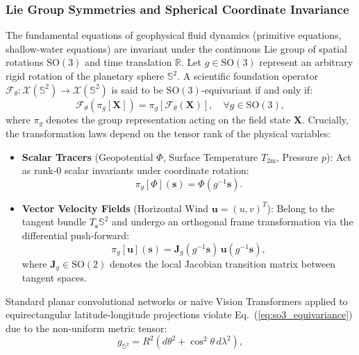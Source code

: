 \subsubsection{Lie Group Symmetries and Spherical Coordinate Invariance}
The fundamental equations of geophysical fluid dynamics (primitive equations, shallow-water equations) are invariant under the continuous Lie group of spatial rotations $\mathrm{SO}(3)$ and time translation $\mathbb{R}$. Let $g \in \mathrm{SO}(3)$ represent an arbitrary rigid rotation of the planetary sphere $\mathbb{S}^2$. A scientific foundation operator $\mathcal{F}_\theta: \mathcal{X}(\mathbb{S}^2) \to \mathcal{X}(\mathbb{S}^2)$ is said to be $\mathrm{SO}(3)$-equivariant if and only if:
\begin{equation}
    \mathcal{F}_\theta(\pi_g[\mathbf{X}]) = \pi_g[\mathcal{F}_\theta(\mathbf{X})], \quad \forall g \in \mathrm{SO}(3),
    \label{eq:so3_equivariance}
\end{equation}
where $\pi_g$ denotes the group representation acting on the field state $\mathbf{X}$. Crucially, the transformation laws depend on the tensor rank of the physical variables:
\begin{itemize}
    \item \textbf{Scalar Tracers} (Geopotential $\Phi$, Surface Temperature $T_{2\text{m}}$, Pressure $p$): Act as rank-0 scalar invariants under coordinate rotation:
    \begin{equation}
        \pi_g[\Phi](\mathbf{s}) = \Phi(g^{-1}\mathbf{s}).
    \end{equation}
    \item \textbf{Vector Velocity Fields} (Horizontal Wind $\mathbf{u} = (u, v)^T$): Belong to the tangent bundle $T_\mathbf{s}\mathbb{S}^2$ and undergo an orthogonal frame transformation via the differential push-forward:
    \begin{equation}
        \pi_g[\mathbf{u}](\mathbf{s}) = \mathbf{J}_g(g^{-1}\mathbf{s}) \, \mathbf{u}(g^{-1}\mathbf{s}),
    \end{equation}
    where $\mathbf{J}_g \in \mathrm{SO}(2)$ denotes the local Jacobian transition matrix between tangent spaces.
\end{itemize}
Standard planar convolutional networks or naive Vision Transformers applied to equirectangular latitude-longitude projections violate Eq.~(\ref{eq:so3_equivariance}) due to the non-uniform metric tensor:
\begin{equation}
    g_{\mathbb{S}^2} = R^2 \left( d\theta^2 + \cos^2\theta \, d\lambda^2 \right),
\end{equation}
